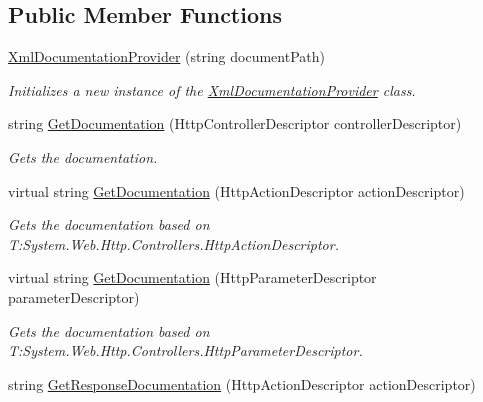 \subsection*{Public Member Functions}
\begin{DoxyCompactItemize}
\item 
\hyperlink{class_open_1_1_g_i_1_1hypermart_1_1_areas_1_1_help_page_1_1_xml_documentation_provider_a20855501bd3ff394652127b70e822308}{Xml\+Documentation\+Provider} (string document\+Path)
\begin{DoxyCompactList}\small\item\em Initializes a new instance of the \hyperlink{class_open_1_1_g_i_1_1hypermart_1_1_areas_1_1_help_page_1_1_xml_documentation_provider}{Xml\+Documentation\+Provider} class. \end{DoxyCompactList}\item 
string \hyperlink{class_open_1_1_g_i_1_1hypermart_1_1_areas_1_1_help_page_1_1_xml_documentation_provider_a05e11e0de4ff25a0e602ce9e5e916056}{Get\+Documentation} (Http\+Controller\+Descriptor controller\+Descriptor)
\begin{DoxyCompactList}\small\item\em Gets the documentation. \end{DoxyCompactList}\item 
virtual string \hyperlink{class_open_1_1_g_i_1_1hypermart_1_1_areas_1_1_help_page_1_1_xml_documentation_provider_ad27b3bee09fd9709d46eb720bff4b860}{Get\+Documentation} (Http\+Action\+Descriptor action\+Descriptor)
\begin{DoxyCompactList}\small\item\em Gets the documentation based on T\+:\+System.\+Web.\+Http.\+Controllers.\+Http\+Action\+Descriptor. \end{DoxyCompactList}\item 
virtual string \hyperlink{class_open_1_1_g_i_1_1hypermart_1_1_areas_1_1_help_page_1_1_xml_documentation_provider_a765e1ebc7e331274a664dd0edba7660c}{Get\+Documentation} (Http\+Parameter\+Descriptor parameter\+Descriptor)
\begin{DoxyCompactList}\small\item\em Gets the documentation based on T\+:\+System.\+Web.\+Http.\+Controllers.\+Http\+Parameter\+Descriptor. \end{DoxyCompactList}\item 
string \hyperlink{class_open_1_1_g_i_1_1hypermart_1_1_areas_1_1_help_page_1_1_xml_documentation_provider_a3f8e45cb0b20d0aef5e795a7ac638346}{Get\+Response\+Documentation} (Http\+Action\+Descriptor action\+Descriptor)

\end{DoxyCompactItemize}
